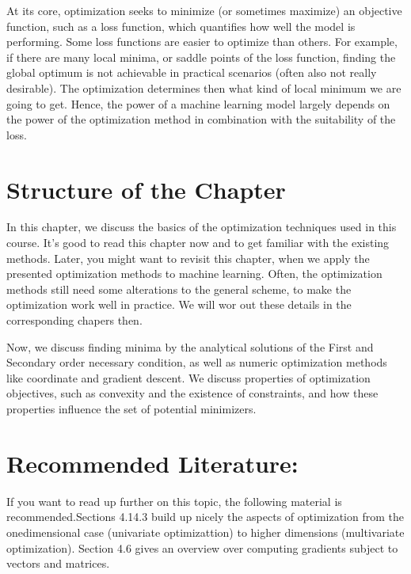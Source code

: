 \documentclass[letterpaper,10pt,english]{jupyterBook}
\begin{document}
\sphinxAtStartPar
At its core, optimization seeks to minimize (or sometimes maximize) an objective function, such as a loss function, which quantifies how well the model is performing. Some loss functions are easier to optimize than others. For example, if there are many local minima, or saddle points of the loss function, finding the global optimum is not achievable in practical scenarios (often also not really desirable). The optimization determines then what kind of local minimum we are going to get. Hence, the power of a machine learning model largely depends on the power of the optimization method in combination with the suitability of the loss.


\section{Structure of the Chapter}
\label{\detokenize{optimization:structure-of-the-chapter}}
\sphinxAtStartPar
In this chapter, we discuss the basics of the optimization techniques used in this course. It’s good to read this chapter now and to get familiar with the existing methods. Later, you might want to revisit this chapter, when we  apply the presented optimization methods to machine learning. Often, the optimization methods still need some alterations to the general scheme, to make the optimization work well in practice. We will wor out these details in the corresponding chapers then.

\sphinxAtStartPar
Now, we discuss finding minima by the analytical solutions of the First and Secondary order necessary condition, as well as numeric optimization methods like coordinate and gradient descent. We discuss properties of optimization objectives, such as convexity and the existence of constraints, and how these properties influence the set of potential minimizers.


\section{Recommended Literature:}
\label{\detokenize{optimization:recommended-literature}}
\sphinxAtStartPar
If you want to read up further on this topic, the following material is recommended.Sections 4.1\sphinxhyphen{}4.3 build up nicely the aspects of optimization from the one\sphinxhyphen{}dimensional case (univariate optimizattion) to higher dimensions (multivariate optimization). Section 4.6 gives an overview over computing gradients subject to vectors and matrices.
\end{document}
